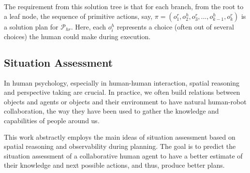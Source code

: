 \documentclass[letterpaper]{article} %
\begin{document}
The requirement from this solution tree is that for each branch, from the root to a leaf node, the sequence of primitive actions, say,  $\pi=(o_1^r,o_2^h,o_3^r,...,o_{k-1}^h,o_k^r)$ is a solution plan for
$\mathcal{P}_{hr}$. 
Here, each $o_i^h$ represents a choice (often out of several choices) the human could make during execution.

\subsection{Situation Assessment} In human psychology, especially in human-human interaction, spatial reasoning and perspective taking are crucial. 
In practice, we often build relations between objects and agents or objects and their environment to have natural human-robot collaboration, the way they have been used to gather the knowledge and capabilities of people around us. 



This work abstractly employs the main ideas of situation assessment based on spatial reasoning and observability during planning. The goal is to predict the situation assessment of a collaborative human agent to have a better estimate of their knowledge and next possible actions, and thus, produce better plans.
\end{document}
